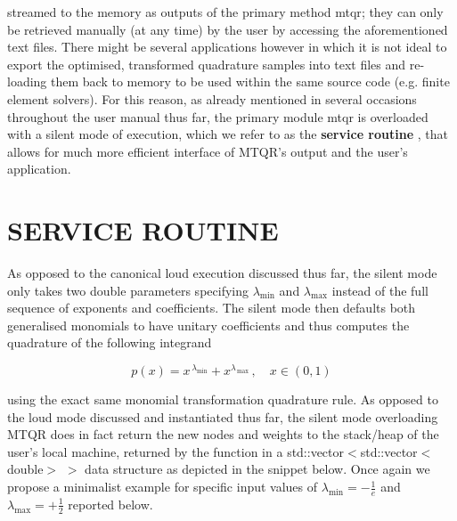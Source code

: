 \documentclass[a4paper, twosided]{book}
\begin{document}
streamed to the memory as outputs of the primary method \colorbox{poliGrayBlue}{mtqr}; they can only be retrieved manually (at any time) by the user by accessing the aforementioned text files. There might be several applications however in which it is not ideal to export the optimised, transformed quadrature samples into text files and re-loading them back to memory to be used within the same source code (e.g. finite element solvers). For this reason, as already mentioned in several occasions throughout the user manual thus far, the primary module \colorbox{poliGrayBlue}{mtqr} is overloaded with a silent mode of execution, which we refer to as the \color{poliDarkBlue} \textbf{service routine} \color{black}, that allows for much more efficient interface of MTQR's output and the user's application.

\section[Service routine]{\changefont SERVICE ROUTINE}\label{Sec3.2.bis}

\noindent
 As opposed to the canonical loud execution discussed thus far, the silent mode only takes two \colorbox{poliGrayBlue}{double} parameters specifying $\lambda_{\text{min}}$ and $\lambda_{\text{max}}$ instead of the full sequence of exponents and coefficients. The silent mode then defaults both generalised monomials to have unitary coefficients and thus computes the quadrature of the following integrand 

\begin{equation*}
    p(x) = x^{\,\lambda_{\text{min}}} + x^{\lambda_{\,\text{max}}}\,,\quad x\in(0,1)
\end{equation*}

\noindent
using the exact same monomial transformation quadrature rule. As opposed to the loud mode discussed and instantiated thus far, the silent mode overloading \colorbox{poliGrayBlue}{MTQR} does in fact return the new nodes and weights to the stack/heap of the user's local machine, returned by the function in a \colorbox{poliGrayBlue}{std::vector$<$std::vector$<$double$>$ $>$} data structure as depicted in the snippet below. Once again we propose a minimalist example for specific input values of $\lambda_{\text{min}} = -\frac{1}{e}$ and $\lambda_{\text{max}} = +\frac{1}{2}$ reported below.

\vspace{0.2cm}
\vspace{0.3cm}
\end{document}

